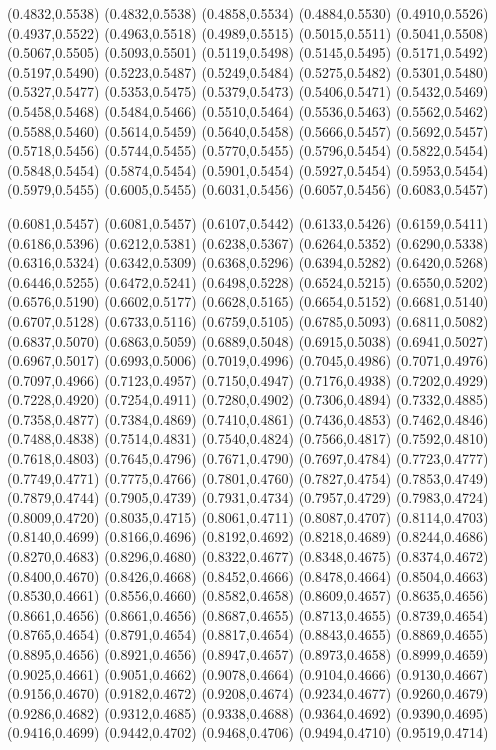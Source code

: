 \PST@VeryThickBorder(0.4832,0.5538)
(0.4832,0.5538)
(0.4858,0.5534)
(0.4884,0.5530)
(0.4910,0.5526)
(0.4937,0.5522)
(0.4963,0.5518)
(0.4989,0.5515)
(0.5015,0.5511)
(0.5041,0.5508)
(0.5067,0.5505)
(0.5093,0.5501)
(0.5119,0.5498)
(0.5145,0.5495)
(0.5171,0.5492)
(0.5197,0.5490)
(0.5223,0.5487)
(0.5249,0.5484)
(0.5275,0.5482)
(0.5301,0.5480)
(0.5327,0.5477)
(0.5353,0.5475)
(0.5379,0.5473)
(0.5406,0.5471)
(0.5432,0.5469)
(0.5458,0.5468)
(0.5484,0.5466)
(0.5510,0.5464)
(0.5536,0.5463)
(0.5562,0.5462)
(0.5588,0.5460)
(0.5614,0.5459)
(0.5640,0.5458)
(0.5666,0.5457)
(0.5692,0.5457)
(0.5718,0.5456)
(0.5744,0.5455)
(0.5770,0.5455)
(0.5796,0.5454)
(0.5822,0.5454)
(0.5848,0.5454)
(0.5874,0.5454)
(0.5901,0.5454)
(0.5927,0.5454)
(0.5953,0.5454)
(0.5979,0.5455)
(0.6005,0.5455)
(0.6031,0.5456)
(0.6057,0.5456)
(0.6083,0.5457)

\PST@ThickBorder(0.6081,0.5457)
(0.6081,0.5457)
(0.6107,0.5442)
(0.6133,0.5426)
(0.6159,0.5411)
(0.6186,0.5396)
(0.6212,0.5381)
(0.6238,0.5367)
(0.6264,0.5352)
(0.6290,0.5338)
(0.6316,0.5324)
(0.6342,0.5309)
(0.6368,0.5296)
(0.6394,0.5282)
(0.6420,0.5268)
(0.6446,0.5255)
(0.6472,0.5241)
(0.6498,0.5228)
(0.6524,0.5215)
(0.6550,0.5202)
(0.6576,0.5190)
(0.6602,0.5177)
(0.6628,0.5165)
(0.6654,0.5152)
(0.6681,0.5140)
(0.6707,0.5128)
(0.6733,0.5116)
(0.6759,0.5105)
(0.6785,0.5093)
(0.6811,0.5082)
(0.6837,0.5070)
(0.6863,0.5059)
(0.6889,0.5048)
(0.6915,0.5038)
(0.6941,0.5027)
(0.6967,0.5017)
(0.6993,0.5006)
(0.7019,0.4996)
(0.7045,0.4986)
(0.7071,0.4976)
(0.7097,0.4966)
(0.7123,0.4957)
(0.7150,0.4947)
(0.7176,0.4938)
(0.7202,0.4929)
(0.7228,0.4920)
(0.7254,0.4911)
(0.7280,0.4902)
(0.7306,0.4894)
(0.7332,0.4885)
(0.7358,0.4877)
(0.7384,0.4869)
(0.7410,0.4861)
(0.7436,0.4853)
(0.7462,0.4846)
(0.7488,0.4838)
(0.7514,0.4831)
(0.7540,0.4824)
(0.7566,0.4817)
(0.7592,0.4810)
(0.7618,0.4803)
(0.7645,0.4796)
(0.7671,0.4790)
(0.7697,0.4784)
(0.7723,0.4777)
(0.7749,0.4771)
(0.7775,0.4766)
(0.7801,0.4760)
(0.7827,0.4754)
(0.7853,0.4749)
(0.7879,0.4744)
(0.7905,0.4739)
(0.7931,0.4734)
(0.7957,0.4729)
(0.7983,0.4724)
(0.8009,0.4720)
(0.8035,0.4715)
(0.8061,0.4711)
(0.8087,0.4707)
(0.8114,0.4703)
(0.8140,0.4699)
(0.8166,0.4696)
(0.8192,0.4692)
(0.8218,0.4689)
(0.8244,0.4686)
(0.8270,0.4683)
(0.8296,0.4680)
(0.8322,0.4677)
(0.8348,0.4675)
(0.8374,0.4672)
(0.8400,0.4670)
(0.8426,0.4668)
(0.8452,0.4666)
(0.8478,0.4664)
(0.8504,0.4663)
(0.8530,0.4661)
(0.8556,0.4660)
(0.8582,0.4658)
(0.8609,0.4657)
(0.8635,0.4656)
(0.8661,0.4656)
\PST@ThickBorder(0.8661,0.4656)
(0.8687,0.4655)
(0.8713,0.4655)
(0.8739,0.4654)
(0.8765,0.4654)
(0.8791,0.4654)
(0.8817,0.4654)
(0.8843,0.4655)
(0.8869,0.4655)
(0.8895,0.4656)
(0.8921,0.4656)
(0.8947,0.4657)
(0.8973,0.4658)
(0.8999,0.4659)
(0.9025,0.4661)
(0.9051,0.4662)
(0.9078,0.4664)
(0.9104,0.4666)
(0.9130,0.4667)
(0.9156,0.4670)
(0.9182,0.4672)
(0.9208,0.4674)
(0.9234,0.4677)
(0.9260,0.4679)
(0.9286,0.4682)
(0.9312,0.4685)
(0.9338,0.4688)
(0.9364,0.4692)
(0.9390,0.4695)
(0.9416,0.4699)
(0.9442,0.4702)
(0.9468,0.4706)
(0.9494,0.4710)
(0.9519,0.4714)

